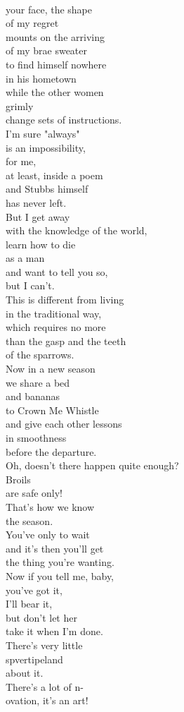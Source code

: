 \documentclass[smalldemyvopaper,11pt,twoside,onecolumn,openright,extrafontsizes]{memoir}
\begin{document}
\\your face, the shape
\\of my regret
\\mounts on the arriving
\\of my brae sweater
\\to find himself nowhere
\\in his hometown
\\while the other women
\\grimly
\\change sets of instructions.
\\I'm sure "always"
\\is an impossibility,
\\for me,
\\at least, inside a poem
\\and Stubbs himself
\\has never left.
\\But I get away
\\with the knowledge of the world,
\\learn how to die
\\as a man
\\and want to tell you so,
\\but I can't.
\\This is different from living
\\in the traditional way,
\\which requires no more
\\than the gasp and the teeth
\\of the sparrows.
\\Now in a new season
\\we share a bed
\\and bananas
\\to Crown Me Whistle
\\and give each other lessons
\\in smoothness
\\before the departure.
\\Oh, doesn't there happen quite enough?
\\Broils
\\are safe only!
\\That's how we know
\\the season.
\\You've only to wait
\\and it's then you'll get
\\the thing you're wanting.
\\Now if you tell me, baby,
\\you've got it,
\\I'll bear it,
\\but don't let her
\\take it when I'm done.
\\There's very little
\\spvertipeland
\\about it.
\\There's a lot of n-
\\ovation, it's an art!
\end{document}
